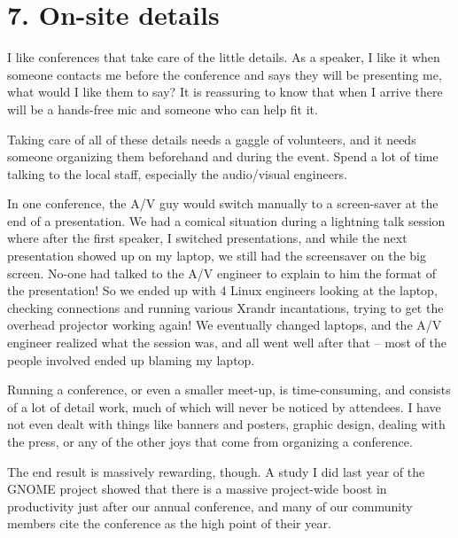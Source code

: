 \section*{7. On-site details}

I like conferences that take care of the little details. As a speaker, I
like it when someone contacts me before the conference and says they will
be presenting me, what would I like them to say? It is reassuring to know
that when I arrive there will be a hands-free mic and someone who can
help fit it.

Taking care of all of these details needs a gaggle of volunteers, and it
needs someone organizing them beforehand and during the event. Spend a
lot of time talking to the local staff, especially the audio/visual
engineers.

In one conference, the A/V guy would switch manually to a screen-saver
at the end of a presentation. We had a comical situation during a
lightning talk session where after the first speaker, I switched
presentations, and while the next presentation showed up on my laptop,
we still had the screensaver on the big screen. No-one had talked to the
A/V engineer to explain to him the format of the presentation!
So we ended up with 4 Linux engineers looking at the laptop, checking
connections and running various Xrandr incantations, trying to get the
overhead projector working again! We eventually changed laptops, and the
A/V engineer realized what the session was, and all went well after that
-- most of the people involved ended up blaming my laptop.

Running a conference, or even a smaller meet-up, is time-consuming, and
consists of a lot of detail work, much of which will never be noticed by
attendees. I have not even dealt with things like banners and posters,
graphic design, dealing with the press, or any of the other joys that
come from organizing a conference.

The end result is massively rewarding, though. A study I did last year
of the GNOME project showed that there is a massive project-wide boost
in productivity just after our annual conference, and many of our
community members cite the conference as the high point of their year.


